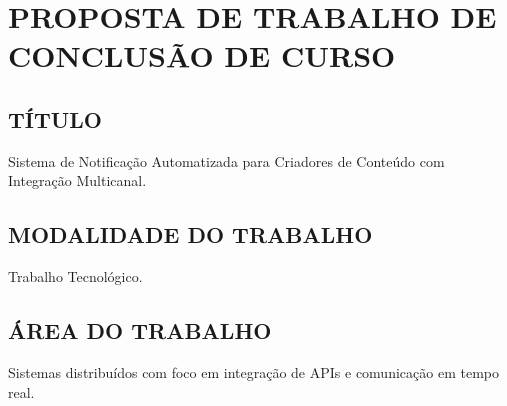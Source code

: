 
\chapter{PROPOSTA DE TRABALHO DE CONCLUSÃO DE CURSO}
\label{chap:proposta}

\section{TÍTULO}
\label{sec:titulo}
Sistema de Notificação Automatizada para Criadores de Conteúdo com Integração Multicanal.

\section{MODALIDADE DO TRABALHO}
\label{sec:modalidade}
Trabalho Tecnológico.

\section{ÁREA DO TRABALHO}
\label{sec:area}
Sistemas distribuídos com foco em integração de APIs e comunicação em tempo real.

